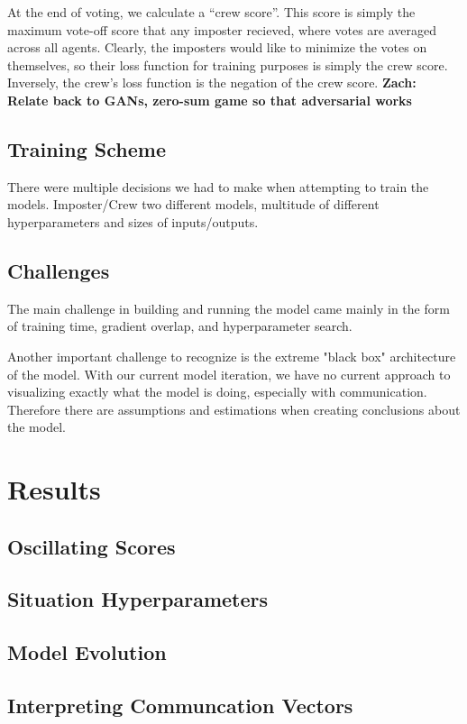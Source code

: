 \documentclass[10pt,twocolumn,letterpaper]{article}
\begin{document}
At the end of voting, we calculate a ``crew score''. This score is simply the
maximum vote-off score that any imposter recieved, where votes
are averaged across all agents. Clearly, the imposters would like to minimize the
votes on themselves, so their loss function for training purposes is
simply the crew score. Inversely, the crew's loss function is the negation of
the crew score.
\textbf{Zach: Relate back to GANs, zero-sum game so that adversarial works}
\subsection{Training Scheme}
There were multiple decisions we had to make when attempting to train the models.
Imposter/Crew two different models, multitude of different hyperparameters and
sizes of inputs/outputs.
\subsection{Challenges}
The main challenge in building and running the model
came mainly in the form of training time, gradient overlap, 
and hyperparameter search.

Another important challenge to recognize is the extreme "black box" architecture
of the model. With our current model iteration, we have no current approach to visualizing
exactly what the model is doing, especially with communication. Therefore there are
assumptions and estimations when creating conclusions about the model.

\section{Results}
\subsection{Oscillating Scores}
\subsection{Situation Hyperparameters}
\subsection{Model Evolution}
\subsection{Interpreting Communcation Vectors}
\end{document}
